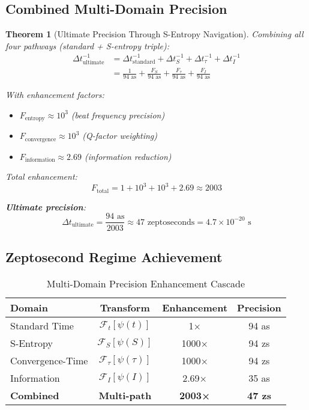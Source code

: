 \documentclass[12pt,a4paper]{article}
\newtheorem{theorem}{Theorem}[section]
\begin{document}
\subsection{Combined Multi-Domain Precision}

\begin{theorem}[Ultimate Precision Through S-Entropy Navigation]
Combining all four pathways (standard + S-entropy triple):
\begin{align}
\Delta t_{\text{ultimate}}^{-1} &= \Delta t_{\text{standard}}^{-1} + \Delta t_S^{-1} + \Delta t_{\tau}^{-1} + \Delta t_I^{-1} \\
&= \frac{1}{94 \text{ as}} + \frac{F_S}{94 \text{ as}} + \frac{F_{\tau}}{94 \text{ as}} + \frac{F_I}{94 \text{ as}}
\end{align}

With enhancement factors:
\begin{itemize}
\item $F_{\text{entropy}} \approx 10^3$ (beat frequency precision)
\item $F_{\text{convergence}} \approx 10^3$ (Q-factor weighting)
\item $F_{\text{information}} \approx 2.69$ (information reduction)
\end{itemize}

Total enhancement:
\begin{equation}
F_{\text{total}} = 1 + 10^3 + 10^3 + 2.69 \approx 2003
\end{equation}

\textbf{Ultimate precision}:
\begin{equation}
\boxed{\Delta t_{\text{ultimate}} = \frac{94 \text{ as}}{2003} \approx 47 \text{ zeptoseconds} = 4.7 \times 10^{-20} \text{ s}}
\end{equation}
\end{theorem}

\subsection{Zeptosecond Regime Achievement}

\begin{table}[H]
\centering
\caption{Multi-Domain Precision Enhancement Cascade}
\begin{tabular}{lccc}
\toprule
Domain & Transform & Enhancement & Precision \\
\midrule
Standard Time & $\mathcal{F}_t[\psi(t)]$ & 1× & 94 as \\
S-Entropy & $\mathcal{F}_S[\psi(S)]$ & 1000× & 94 zs \\
Convergence-Time & $\mathcal{F}_{\tau}[\psi(\tau)]$ & 1000× & 94 zs \\
Information & $\mathcal{F}_I[\psi(I)]$ & 2.69× & 35 as \\
\midrule
\textbf{Combined} & \textbf{Multi-path} & \textbf{2003×} & \textbf{47 zs} \\
\bottomrule
\end{tabular}
\end{table}
\end{document}
